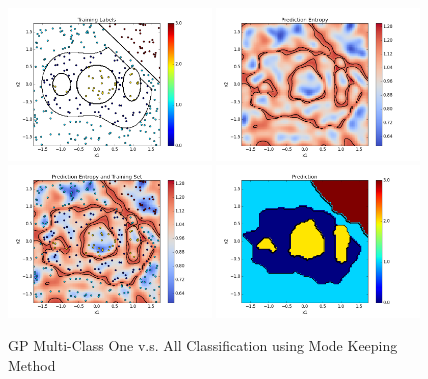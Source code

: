 				\begin{figure}[!htbp]
					\centering
						\includegraphics[width=0.48\textwidth]{Figures/Progress/modekeepingOVA/Figure1.png}
						\includegraphics[width=0.48\textwidth]{Figures/Progress/modekeepingOVA/Figure2.png}
						\includegraphics[width=0.48\textwidth]{Figures/Progress/modekeepingOVA/Figure3.png}
						\includegraphics[width=0.48\textwidth]{Figures/Progress/modekeepingOVA/Figure4.png}
					\caption{GP Multi-Class One v.s. All Classification using Mode Keeping Method}
					\label{ProgressReport:GaussianProcessModels:Figure:modekeepingOVA1}
				\end{figure}

